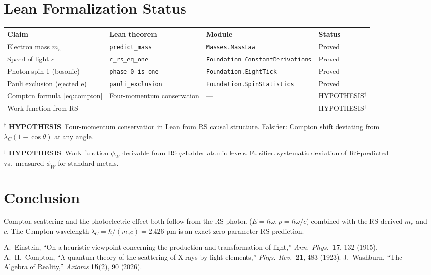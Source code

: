 \documentclass[12pt,a4paper]{article}
\theoremstyle{definition}
\theoremstyle{remark}
\begin{document}
\section{Lean Formalization Status}

\begin{center}
\begin{tabular}{llll}
\toprule
Claim & Lean theorem & Module & Status \\
\midrule
Electron mass $m_e$ & \texttt{predict\_mass} & \texttt{Masses.MassLaw} & Proved \\
Speed of light $c$ & \texttt{c\_rs\_eq\_one} & \texttt{Foundation.ConstantDerivations} & Proved \\
Photon spin-1 (bosonic) & \texttt{phase\_0\_is\_one} & \texttt{Foundation.EightTick} & Proved \\
Pauli exclusion (ejected e) & \texttt{pauli\_exclusion} & \texttt{Foundation.SpinStatistics} & Proved \\
Compton formula~\eqref{eq:compton} & Four-momentum conservation & --- & HYPOTHESIS$^\dagger$ \\
Work function from RS & --- & --- & HYPOTHESIS$^\ddagger$ \\
\bottomrule
\end{tabular}
\end{center}

$^\dagger$ \textbf{HYPOTHESIS}: Four-momentum conservation in Lean from RS
causal structure. Falsifier: Compton shift deviating from $\lambda_C(1-\cos\theta)$ at any angle.

$^\ddagger$ \textbf{HYPOTHESIS}: Work function $\phi_W$ derivable from RS $\varphi$-ladder atomic levels. Falsifier: systematic deviation of RS-predicted vs.\ measured $\phi_W$ for standard metals.

\section{Conclusion}

Compton scattering and the photoelectric effect both follow from the RS
photon ($E = \hbar\omega$, $p = \hbar\omega/c$) combined with the RS-derived
$m_e$ and $c$.  The Compton wavelength $\lambda_C = \hbar/(m_e c) = 2.426$ pm
is an exact zero-parameter RS prediction.

\begin{thebibliography}{99}
 A.~Einstein, ``On a heuristic viewpoint concerning the production and transformation of light,'' \textit{Ann.\ Phys.}\ \textbf{17}, 132 (1905).
 A.~H.~Compton, ``A quantum theory of the scattering of X-rays by light elements,'' \textit{Phys.\ Rev.}\ \textbf{21}, 483 (1923).
 J.~Washburn, ``The Algebra of Reality,'' \textit{Axioms} \textbf{15}(2), 90 (2026).
\end{thebibliography}
\end{document}
